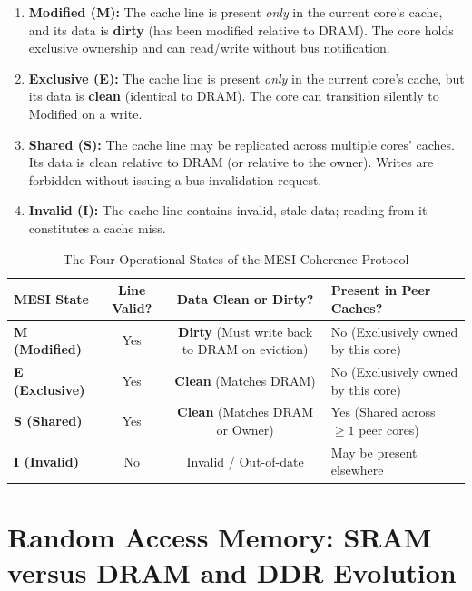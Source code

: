\begin{enumerate}[label=\bfseries\arabic*.]
    \item \textbf{Modified (M):} The cache line is present \textit{only} in the current core's cache, and its data is \textbf{dirty} (has been modified relative to DRAM). The core holds exclusive ownership and can read/write without bus notification.
    \item \textbf{Exclusive (E):} The cache line is present \textit{only} in the current core's cache, but its data is \textbf{clean} (identical to DRAM). The core can transition silently to Modified on a write.
    \item \textbf{Shared (S):} The cache line may be replicated across multiple cores' caches. Its data is clean relative to DRAM (or relative to the owner). Writes are forbidden without issuing a bus invalidation request.
    \item \textbf{Invalid (I):} The cache line contains invalid, stale data; reading from it constitutes a cache miss.
\end{enumerate}

\begin{table}[htbp]
\centering
\small
\caption{The Four Operational States of the MESI Coherence Protocol}
\label{tab:mesi_states}
\begin{tabularx}{\textwidth}{l c c X}
\toprule
\textbf{MESI State} & \textbf{Line Valid?} & \textbf{Data Clean or Dirty?} & \textbf{Present in Peer Caches?} \\
\midrule
\textbf{M (Modified)} & Yes & \textbf{Dirty} (Must write back to DRAM on eviction) & No (Exclusively owned by this core) \\
\textbf{E (Exclusive)} & Yes & \textbf{Clean} (Matches DRAM) & No (Exclusively owned by this core) \\
\textbf{S (Shared)} & Yes & \textbf{Clean} (Matches DRAM or Owner) & Yes (Shared across $\ge 1$ peer cores) \\
\textbf{I (Invalid)} & No & Invalid / Out-of-date & May be present elsewhere \\
\bottomrule
\end{tabularx}
\end{table}


\section{Random Access Memory: SRAM versus DRAM and DDR Evolution}
\label{sec:ram_technologies}

